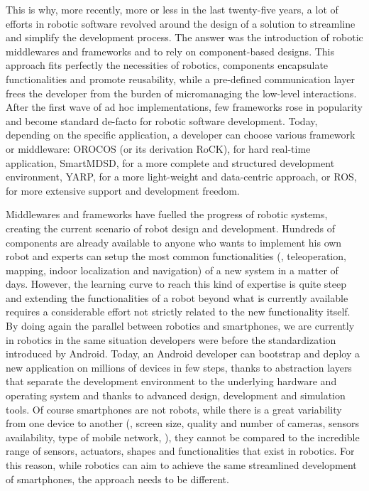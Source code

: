 This is why, more recently, more or less in the last twenty-five years, a lot of efforts in robotic software revolved around the design of a solution to streamline and simplify the development process. The answer was the introduction of robotic middlewares and frameworks and to rely on component-based designs. This approach fits perfectly the necessities of robotics, components encapsulate functionalities and promote reusability, while a pre-defined communication layer frees the developer from the burden of micromanaging the low-level interactions. After the first wave of ad hoc implementations, few frameworks rose in popularity and become standard de-facto for robotic software development. Today, depending on the specific application, a developer can choose various framework or middleware: OROCOS (or its derivation RoCK), for hard real-time application, SmartMDSD, for a more complete and structured development environment, YARP, for a more light-weight and data-centric approach, or ROS, for more extensive support and development freedom.

Middlewares and frameworks have fuelled the progress of robotic systems, creating the current scenario of robot design and development. Hundreds of components are already available to anyone who wants to implement his own robot and experts can setup the most common functionalities (\ie, teleoperation, mapping, indoor localization and navigation) of a new system in a matter of days. However, the learning curve to reach this kind of expertise is quite steep and extending the functionalities of a robot beyond what is currently available requires a considerable effort not strictly related to the new functionality itself.  By doing again the parallel between robotics and smartphones, we are currently in robotics in the same situation developers were before the standardization introduced by Android. Today, an Android developer can bootstrap and deploy a new application on millions of devices in few steps, thanks to abstraction layers that separate the development environment to the underlying hardware and operating system and thanks to advanced design, development and simulation tools. Of course smartphones are not robots, while there is a great variability from one device to another (\eg, screen size, quality and number of cameras, sensors availability, type of mobile network, \etc), they cannot be compared to the incredible range of sensors, actuators, shapes and functionalities that exist in robotics. For this reason, while robotics can aim to achieve the same streamlined development of smartphones, the approach needs to be different.

